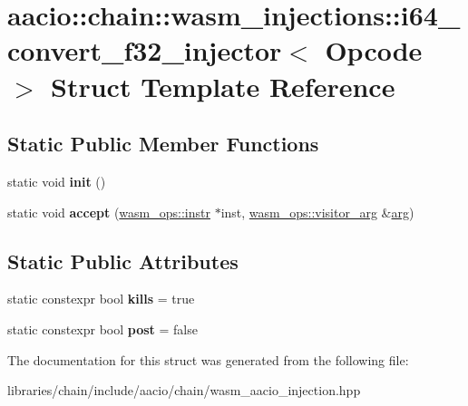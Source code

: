 \hypertarget{structaacio_1_1chain_1_1wasm__injections_1_1i64__convert__f32__injector}{}\section{aacio\+:\+:chain\+:\+:wasm\+\_\+injections\+:\+:i64\+\_\+convert\+\_\+f32\+\_\+injector$<$ Opcode $>$ Struct Template Reference}
\label{structaacio_1_1chain_1_1wasm__injections_1_1i64__convert__f32__injector}
\subsection*{Static Public Member Functions}
\begin{DoxyCompactItemize}
\item 
\mbox{\label{structaacio_1_1chain_1_1wasm__injections_1_1i64__convert__f32__injector_ab30fd2de3e3efe31baa1c11411361db3}} 
static void {\bfseries init} ()
\item 
\mbox{\label{structaacio_1_1chain_1_1wasm__injections_1_1i64__convert__f32__injector_ad5d4e0bfd132eeb1d2a73ec7648904f0}} 
static void {\bfseries accept} (\mbox{\hyperlink{structaacio_1_1chain_1_1wasm__ops_1_1instr}{wasm\+\_\+ops\+::instr}} $\ast$inst, \mbox{\hyperlink{structaacio_1_1chain_1_1wasm__ops_1_1visitor__arg}{wasm\+\_\+ops\+::visitor\+\_\+arg}} \&\mbox{\hyperlink{unionarg}{arg}})
\end{DoxyCompactItemize}
\subsection*{Static Public Attributes}
\begin{DoxyCompactItemize}
\item 
\mbox{\label{structaacio_1_1chain_1_1wasm__injections_1_1i64__convert__f32__injector_a250121804da0758811ce86150edb17e7}} 
static constexpr bool {\bfseries kills} = true
\item 
\mbox{\label{structaacio_1_1chain_1_1wasm__injections_1_1i64__convert__f32__injector_ade3946d48e86e1d3c9558aeb11361d66}} 
static constexpr bool {\bfseries post} = false
\end{DoxyCompactItemize}


The documentation for this struct was generated from the following file\+:\begin{DoxyCompactItemize}
\item 
libraries/chain/include/aacio/chain/wasm\+\_\+aacio\+\_\+injection.\+hpp\end{DoxyCompactItemize}
